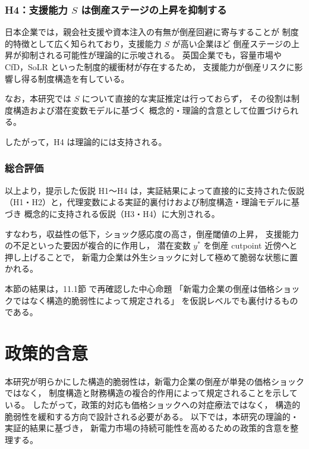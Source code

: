 \subsubsection*{H4：支援能力 $S$ は倒産ステージの上昇を抑制する}

日本企業では，親会社支援や資本注入の有無が倒産回避に寄与することが
制度的特徴として広く知られており，支援能力 $S$ が高い企業ほど
倒産ステージの上昇が抑制される可能性が理論的に示唆される。
英国企業でも，容量市場や CfD，SoLR といった制度的緩衝材が存在するため，
支援能力が倒産リスクに影響し得る制度構造を有している。

なお，本研究では $S$ について直接的な実証推定は行っておらず，
その役割は制度構造および潜在変数モデルに基づく
概念的・理論的含意として位置づけられる。

したがって，H4 は理論的には支持される。


\subsubsection*{総合評価}

以上より，提示した仮説 H1〜H4 は，実証結果によって直接的に支持された仮説
（H1・H2）と，代理変数による実証的裏付けおよび制度構造・理論モデルに基づき
概念的に支持される仮説（H3・H4）に大別される。

すなわち，収益性の低下，ショック感応度の高さ，倒産閾値の上昇，
支援能力の不足といった要因が複合的に作用し，
潜在変数 $y^*$ を倒産 cutpoint 近傍へと押し上げることで，
新電力企業は外生ショックに対して極めて脆弱な状態に置かれる。


本節の結果は，11.1節 で再確認した中心命題
「新電力企業の倒産は価格ショックではなく構造的脆弱性によって規定される」
を仮説レベルでも裏付けるものである。


\section{政策的含意}

本研究が明らかにした構造的脆弱性は，新電力企業の倒産が単発の価格ショックではなく，
制度構造と財務構造の複合的作用によって規定されることを示している。
したがって，政策的対応も価格ショックへの対症療法ではなく，
構造的脆弱性を緩和する方向で設計される必要がある。
以下では，本研究の理論的・実証的結果に基づき，
新電力市場の持続可能性を高めるための政策的含意を整理する。

